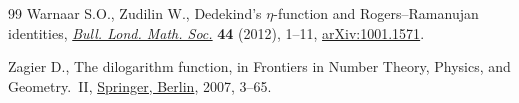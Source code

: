 \begin{thebibliography}{99}
Warnaar S.O., Zudilin W., Dedekind's {$\eta$}-function and
 {R}ogers--{R}amanujan identities,
 \href{https://doi.org/10.1112/blms/bdr019}{\textit{Bull. Lond. Math. Soc.}}
 \textbf{44} (2012), 1--11,
 \href{http://arxiv.org/abs/1001.1571}{arXiv:1001.1571}.

Zagier D., The dilogarithm function, in Frontiers in Number Theory, Physics, and Geometry.~{II},
 \href{https://doi.org/10.1007/978-3-540-30308-4_1}{Springer, Berlin}, 2007,
 3--65.

\end{thebibliography}
